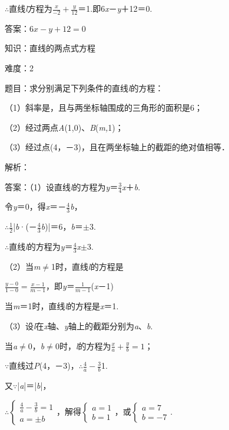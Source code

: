 \documentclass{article} %
\begin{document}
$\mathrm{\therefore}$直线\textit{l}方程为$\frac{x}{-2}+\frac{y}{12}$＝1.即6\textit{x}－\textit{y}＋12＝0.

答案：$6x-y+12=0$

知识：直线的两点式方程

难度：2

题目：求分别满足下列条件的直线\textit{l}的方程：

（1）斜率是，且与两坐标轴围成的三角形的面积是6；

（2）经过两点\textit{A}(1,0)、\textit{B}(\textit{m,}1)；

（3）经过点(4，－3)，且在两坐标轴上的截距的绝对值相等．

解析：

答案：（1）设直线\textit{l}的方程为\textit{y}＝$\frac{3}{4}$\textit{x}＋\textit{b}.

令\textit{y}＝0，得\textit{x}＝－$\frac{4}{3}$\textit{b}，

$\mathrm{\therefore}\frac{1}{2}$|\textit{b}·(－$\frac{4}{3}$\textit{b})|＝6，\textit{b}＝$\mathrm{\pm}$3.

$\mathrm{\therefore}$直线\textit{l}的方程为\textit{y}＝$\frac{4}{3}$\textit{x}$\mathrm{\pm}$3.

（2）当\textit{m}$\mathrm{\neq}$1时，直线\textit{l}的方程是

$\frac{y-0}{1-0}=\frac{x-1}{m-1}$，即\textit{y}＝$\frac{1}{m-1}$(\textit{x}－1)

当\textit{m}＝1时，直线\textit{l}的方程是\textit{x}＝1.

（3）设\textit{l}在\textit{x}轴、\textit{y}轴上的截距分别为\textit{a}、\textit{b}.

当\textit{a}$\mathrm{\neq}$0，\textit{b}$\mathrm{\neq}$0时，\textit{l}的方程为$\frac{x}{a}+\frac{y}{b}=1$；

$\mathrm{\because}$直线过\textit{P}(4，－3)，$\mathrm{\therefore}\frac{4}{a}-\frac{3}{b}$1.

又$\mathrm{\because}$|\textit{a}|＝|\textit{b}|，

$\mathrm{\therefore}\left\{\begin{array}{l} \frac{4}{a}-\frac{3}{b}=1\\ a=\pm b  \end{array}\right.$，解得$\left\{\begin{array}{l} a=1\\ b=1 \end{array}\right.$，或$\left\{\begin{array}{l} a=7\\ b=-7 \end{array}\right.$.
\end{document}
